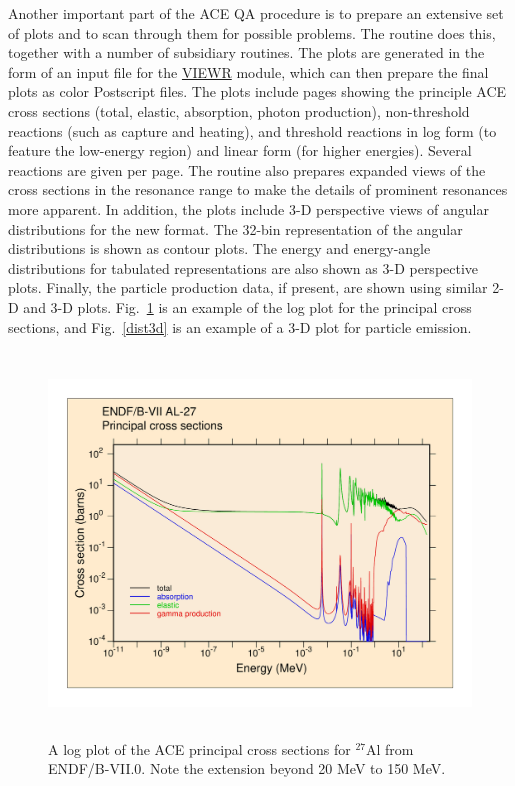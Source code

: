 Another important part of the ACE QA procedure is to prepare an
extensive set of plots and to scan through them for possible problems.
The  routine does this,
together with a number of subsidiary routines.  The plots are
generated in the form of an input file for the
\hyperlink{sVIEWRhy}{VIEWR}
module, which can then prepare the final plots as color Postscript
files.  The plots include pages showing the principle ACE
cross sections (total, elastic, absorption, photon production),
non-threshold reactions (such as capture and heating), and
threshold reactions in log form (to feature the low-energy region)
and linear form (for higher energies).  Several reactions are given
per page.  The routine also prepares expanded views of the cross
sections in the resonance range to make the details of prominent
resonances more apparent.  In addition, the plots include 3-D
perspective views of angular distributions for the new format.
The 32-bin representation of the angular distributions is shown as
contour plots.  The energy and energy-angle distributions for
tabulated representations are also shown as 3-D perspective plots.
Finally, the particle production data, if present, are shown using
similar 2-D and 3-D plots.  Fig.~\ref{pxsec} is an example of
the log plot for the principal cross sections, and Fig.~\ref{dist3d}
is an example of a 3-D plot for particle emission.

\begin{figure}[b]\centering
\includegraphics[keepaspectratio, height=4.0in, angle=0]{figs/acer1ack}
\caption[Principal cross sections for ENDF/B-VII.0 $^{27}$Al]{A log plot
 of the ACE principal cross sections for $^{27}$Al from ENDF/B-VII.0.  Note
 the extension beyond 20 MeV to 150 MeV.}
\label{pxsec}
\end{figure}

